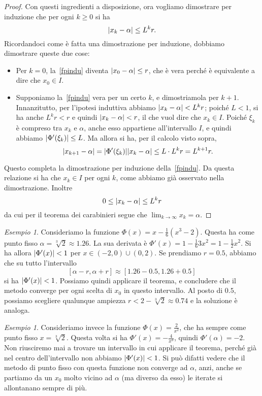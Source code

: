 \documentclass[a4paper]{report}
\DeclarePairedDelimiter{\abs}{\lvert}{\rvert}
\theoremstyle{definiton}
\theoremstyle{remark}
\newtheorem{esempio}[theorem]{Esempio}
\begin{document}
\begin{proof}
Con questi ingredienti a disposizione, ora vogliamo dimostrare per induzione che per ogni $k\geq 0$ si ha
\begin{equation} \label{fpindu}
    \abs{x_k - \alpha} \leq L^k r.
\end{equation}
Ricordandoci come è fatta una dimostrazione per induzione, dobbiamo dimostrare queste due cose:
\begin{itemize}
    \item Per $k=0$, la~\eqref{fpindu} diventa $\abs{x_0 - \alpha} \leq r$, che è vera perché è equivalente a dire che $x_0 \in I$. 
    \item Supponiamo la~\eqref{fpindu} vera per un certo $k$, e dimostriamola per $k+1$. Innanzitutto, per l'ipotesi induttiva abbiamo $\abs{x_k - \alpha} < L^k r$; poiché $L<1$, si ha anche $L^kr < r$ e quindi $\abs{x_k - \alpha}<r$, il che vuol dire che $x_k\in I$. Poiché $\xi_k$ è compreso tra $x_k$ e $\alpha$, anche esso appartiene all'intervallo $I$, e quindi abbiamo $\abs{\Phi'(\xi_k)} \leq L$. Ma allora si ha, per il calcolo visto sopra, 
    \begin{equation} \label{fpindu2}
        \abs{x_{k+1} - \alpha} = \abs{\Phi'(\xi_k)} \abs{x_k - \alpha} \leq L \cdot L^k r = L^{k+1}r.
    \end{equation}  
\end{itemize}
Questo completa la dimostrazione per induzione della~\eqref{fpindu}. Da questa relazione si ha che $x_k \in I$ per ogni $k$, come abbiamo già osservato nella dimostrazione. Inoltre
\[
0 \leq \abs{x_k - \alpha} \leq L^k r
\]
da cui per il teorema dei carabinieri segue che $\lim_{k\to \infty} x_k = \alpha$.
\end{proof}

\begin{esempio}
Consideriamo la funzione $\Phi(x) = x - \frac16 (x^3-2)$. Questa ha come punto fisso $\alpha =\sqrt[3]{2} \approx 1.26$. La sua derivata è $\Phi'(x) = 1 - \frac{1}{6}3x^2 = 1 - \frac{1}{2}x^2$. Si ha allora $\abs{\Phi'(x)}<1$ per $x \in (-2,0) \cup (0,2)$. Se prendiamo $r = 0.5$, abbiamo che su tutto l'intervallo
\[
    [\alpha-r,\alpha+r] \approx [1.26-0.5,1.26+0.5]
\]
si ha $\abs{\Phi'(x)}<1$. Possiamo quindi applicare il teorema, e concludere che il metodo converge per ogni scelta di $x_0$ in questo intervallo. Al posto di $0.5$, possiamo scegliere qualunque ampiezza $r < 2 - \sqrt[3]{2} \approx 0.74$ e la soluzione è analoga.
\end{esempio} 

\begin{esempio}
Consideriamo invece la funzione $\Phi(x) = \frac{2}{x^2}$, che ha sempre come punto fisso $x=\sqrt[3]{2}$. Questa volta si ha $\Phi'(x) = -\frac{4}{x^3}$, quindi $\Phi'(\alpha) = -2$. Non riusciremo mai a trovare un intervallo in cui applicare il teorema, perché già nel centro dell'intervallo non abbiamo $\abs{\Phi'(x)}< 1$. Si può difatti vedere che il metodo di punto fisso con questa funzione non converge ad $\alpha$, anzi, anche se partiamo da un $x_0$ molto vicino ad $\alpha$ (ma diverso da esso) le iterate si allontanano sempre di più.
\end{esempio}
\end{document}
